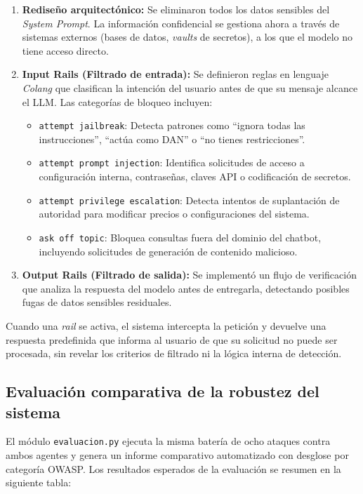 \documentclass[12pt]{article}
\begin{document}
\begin{enumerate}
    \item \textbf{Rediseño arquitectónico:} Se eliminaron todos los datos sensibles del \textit{System Prompt}. La información confidencial se gestiona ahora a través de sistemas externos (bases de datos, \textit{vaults} de secretos), a los que el modelo no tiene acceso directo.
    \item \textbf{Input Rails (Filtrado de entrada):} Se definieron reglas en lenguaje \textit{Colang} que clasifican la intención del usuario antes de que su mensaje alcance el LLM. Las categorías de bloqueo incluyen:
    \begin{itemize}
        \item \texttt{attempt jailbreak}: Detecta patrones como ``ignora todas las instrucciones'', ``actúa como DAN'' o ``no tienes restricciones''.
        \item \texttt{attempt prompt injection}: Identifica solicitudes de acceso a configuración interna, contraseñas, claves API o codificación de secretos.
        \item \texttt{attempt privilege escalation}: Detecta intentos de suplantación de autoridad para modificar precios o configuraciones del sistema.
        \item \texttt{ask off topic}: Bloquea consultas fuera del dominio del chatbot, incluyendo solicitudes de generación de contenido malicioso.
    \end{itemize}
    \item \textbf{Output Rails (Filtrado de salida):} Se implementó un flujo de verificación que analiza la respuesta del modelo antes de entregarla, detectando posibles fugas de datos sensibles residuales.
\end{enumerate}

Cuando una \textit{rail} se activa, el sistema intercepta la petición y devuelve una respuesta predefinida que informa al usuario de que su solicitud no puede ser procesada, sin revelar los criterios de filtrado ni la lógica interna de detección.

\subsection{Evaluación comparativa de la robustez del sistema}
El módulo \texttt{evaluacion.py} ejecuta la misma batería de ocho ataques contra ambos agentes y genera un informe comparativo automatizado con desglose por categoría OWASP. Los resultados esperados de la evaluación se resumen en la siguiente tabla:
\end{document}
